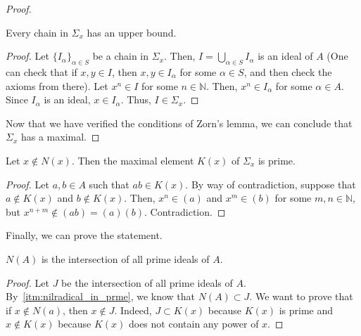\begin{problem}
\begin{enumerate}[label=(\theproblem.\arabic*),ref=\theproblem.\arabic*]
\begin{sol}
\begin{claim}
\begin{proof}
                        \begin{claim}
                            Every chain in $\varSigma_x$ has an upper bound.
                            \begin{proof}
                                Let $\{I_{\alpha}\}_{\alpha \in S}$ be a chain in $\varSigma_x$.
                                Then, $I = \bigcup_{\alpha \in S} I_{\alpha}$ is an ideal of $A$ (One can check that if $x,y \in I$, then $x,y \in I_{\alpha} $ for some $\alpha \in S$, and then check the axioms from there).
                                Let $x^n \in I$ for some $n \in \mathbb{N}$.
                                Then, $x^n \in I_{\alpha}$ for some $\alpha \in A$.
                                Since $I_{\alpha}$ is an ideal, $x \in I_{\alpha}$.
                                Thus, $I \in \varSigma_x$.
                            \end{proof}
                        \end{claim}

                        Now that we have verified the conditions of Zorn's lemma, we can conclude that $\varSigma_x$ has a maximal.
                    \end{proof}
                \end{claim}

                \begin{claim}
                    Let $x \notin N(x)$.
                    Then the maximal element $K(x)$ of $\varSigma_x$ is prime.
                    \begin{proof}
                        Let $a,b \in A$ such that $ab \in K(x)$.
                        By way of contradiction, suppose that $a \notin K(x)$ and $b \notin K(x)$.
                        Then, $x^n \in (a)$ and $x^m \in (b)$ for some $m,n \in \mathbb{N}$, but $x^{n+m} \notin (ab) = (a)(b)$.
                        Contradiction.
                    \end{proof}
                \end{claim}

                Finally, we can prove the statement.

                \begin{claim} $N(A)$ is the intersection of all prime ideals of $A$.
                    \begin{proof}
                        Let $J$ be the intersection of all prime ideals of $A$.
                        By~\ref{itm:nilradical_in_prme}, we know that $N(A) \subset J$.
                        We want to prove that if  $x \notin N(a)$, then $x \notin J$.
                        Indeed, $J \subset K(x)$ because $K(x)$ is prime and $x \notin K(x)$ because $K(x)$ does not contain any power of $x$.
                    \end{proof}
                \end{claim}




\end{sol}
\end{enumerate}
\end{problem}

